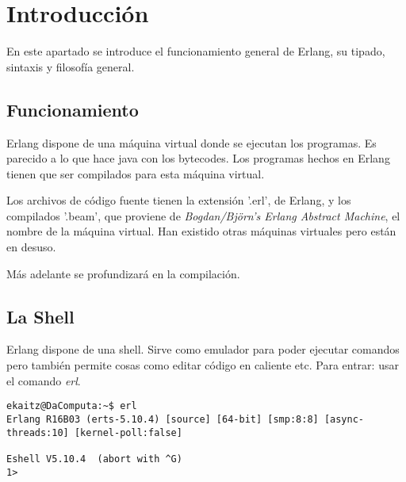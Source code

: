 
\section{Introducción}

En este apartado se introduce el funcionamiento general de Erlang, su tipado, sintaxis y filosofía general.

\subsection{Funcionamiento}

Erlang dispone de una máquina virtual donde se ejecutan los programas. Es parecido a lo que hace java con los
bytecodes. Los programas hechos en Erlang tienen que ser compilados para esta máquina virtual.

Los archivos de código fuente tienen la extensión '.erl', de Erlang,  y los compilados '.beam', que proviene
de \textit{Bogdan/Björn's Erlang Abstract Machine}, el nombre de la máquina virtual. Han existido otras
máquinas virtuales pero están en desuso.

Más adelante se profundizará en la compilación.

\subsection{La Shell}

Erlang dispone de una shell. Sirve como emulador para poder ejecutar comandos pero también permite cosas como
editar código en caliente etc. Para entrar: usar el comando \textit{erl}.

\begin{lstlisting}
ekaitz@DaComputa:~$ erl
Erlang R16B03 (erts-5.10.4) [source] [64-bit] [smp:8:8] [async-threads:10] [kernel-poll:false]

Eshell V5.10.4  (abort with ^G)
1>
\end{lstlisting}

